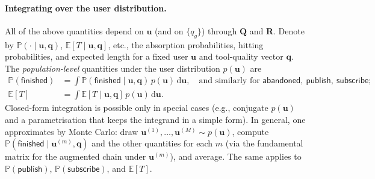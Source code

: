 \paragraph{Integrating over the user distribution.}
All of the above quantities depend on $\mathbf{u}$ (and on $\{q_g\}$) through $\mathbf{Q}$ and $\mathbf{R}$. Denote by $\mathbb{P}(\cdot \mid \mathbf{u}, \mathbf{q})$, $\mathbb{E}[T \mid \mathbf{u}, \mathbf{q}]$, etc., the absorption probabilities, hitting probabilities, and expected length for a fixed user $\mathbf{u}$ and tool-quality vector $\mathbf{q}$. The \emph{population-level} quantities under the user distribution $p(\mathbf{u})$ are
\begin{align}
  \mathbb{P}(\mathsf{finished}) &= \int \mathbb{P}(\mathsf{finished} \mid \mathbf{u}, \mathbf{q})\, p(\mathbf{u})\, \mathrm{d}\mathbf{u}, \quad \text{and similarly for }\mathsf{abandoned},\ \mathsf{publish},\ \mathsf{subscribe}; \label{eq:pop-absorb} \\
  \mathbb{E}[T] &= \int \mathbb{E}[T \mid \mathbf{u}, \mathbf{q}]\, p(\mathbf{u})\, \mathrm{d}\mathbf{u}. \label{eq:pop-length}
\end{align}
Closed-form integration is possible only in special cases (e.g., conjugate $p(\mathbf{u})$ and a parametrisation that keeps the integrand in a simple form). In general, one approximates by Monte Carlo: draw $\mathbf{u}^{(1)}, \ldots, \mathbf{u}^{(M)} \sim p(\mathbf{u})$, compute $\mathbb{P}(\mathsf{finished} \mid \mathbf{u}^{(m)}, \mathbf{q})$ and the other quantities for each $m$ (via the fundamental matrix for the augmented chain under $\mathbf{u}^{(m)}$), and average. The same applies to $\mathbb{P}(\mathsf{publish})$, $\mathbb{P}(\mathsf{subscribe})$, and $\mathbb{E}[T]$.

